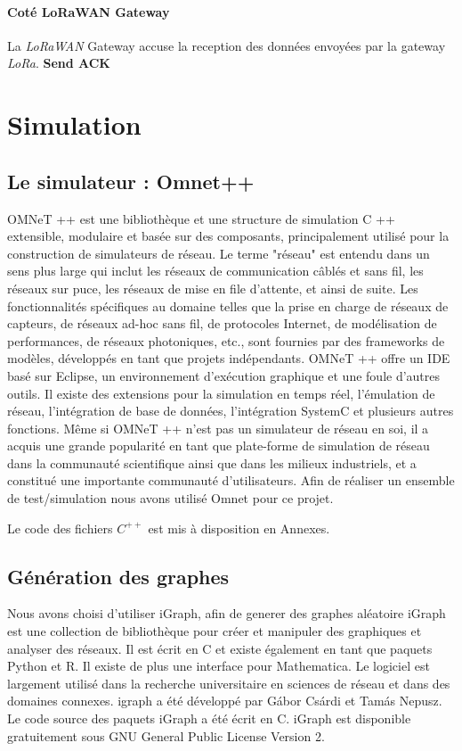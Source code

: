 \documentclass[11pt]{article}
\begin{document}
\paragraph{Coté LoRaWAN Gateway}
La \textit{LoRaWAN} Gateway accuse la reception des données envoyées par la gateway \textit{LoRa}.
\textbf{Send ACK}


\newpage
\section{Simulation}

\subsection{Le simulateur : Omnet++}
OMNeT ++ est une bibliothèque et une structure de simulation C ++ extensible, modulaire et basée sur des composants, principalement utilisé pour la construction de simulateurs de réseau. Le terme "réseau" est entendu dans un sens plus large qui inclut les réseaux de communication câblés et sans fil, les réseaux sur puce, les réseaux de mise en file d'attente, et ainsi de suite. Les fonctionnalités spécifiques au domaine telles que la prise en charge de réseaux de capteurs, de réseaux ad-hoc sans fil, de protocoles Internet, de modélisation de performances, de réseaux photoniques, etc., sont fournies par des frameworks de modèles, développés en tant que projets indépendants. OMNeT ++ offre un IDE basé sur Eclipse, un environnement d'exécution graphique et une foule d'autres outils. Il existe des extensions pour la simulation en temps réel, l'émulation de réseau, l'intégration de base de données, l'intégration SystemC et plusieurs autres fonctions.
Même si OMNeT ++ n'est pas un simulateur de réseau en soi, il a acquis une grande popularité en tant que plate-forme de simulation de réseau dans la communauté scientifique ainsi que dans les milieux industriels, et a constitué une importante communauté d'utilisateurs.
Afin de réaliser un ensemble de test/simulation nous avons utilisé Omnet pour ce projet.

Le code des fichiers $C^{++}$ est mis à disposition en Annexes.
\subsection{Génération des graphes}
Nous avons choisi d'utiliser iGraph, afin de generer des graphes aléatoire
iGraph est une collection de bibliothèque pour créer et manipuler des graphiques et analyser des réseaux. Il est écrit en C et existe également en tant que paquets Python et R. Il existe de plus une interface pour Mathematica. Le logiciel est largement utilisé dans la recherche universitaire en sciences de réseau et dans des domaines connexes.
igraph a été développé par Gábor Csárdi et Tamás Nepusz. Le code source des paquets iGraph a été écrit en C. iGraph est disponible gratuitement sous GNU General Public License Version 2.
\end{document}
